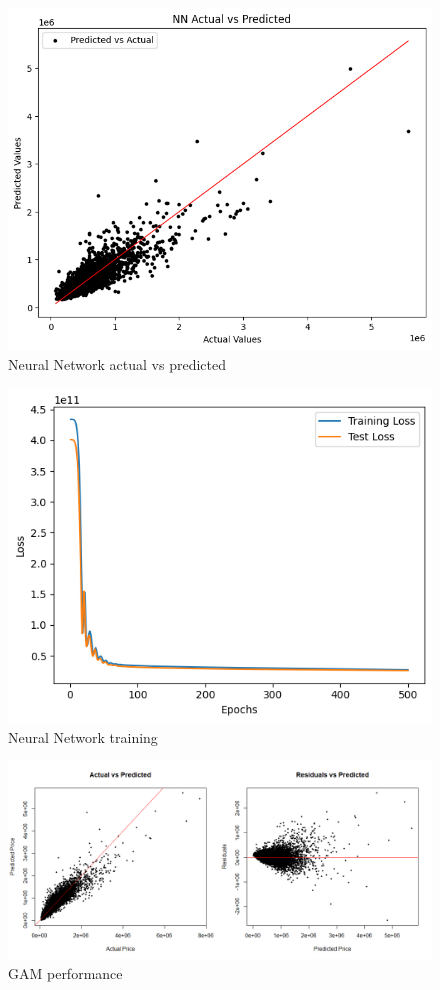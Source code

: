 \documentclass[a4paper, 11pt]{article}
\begin{document}
\begin{figure}[H]
\includegraphics[scale=0.7]{NNpred}
\centering
\caption{Neural Network actual vs predicted}
\label{fig:NNpred}
\end{figure}

\begin{figure}[H]
\includegraphics[scale=0.75]{traintestloss}
\centering
\caption{Neural Network training}
\label{fig:traintestloss}
\end{figure}

\begin{figure}[H]
\includegraphics[scale=0.5]{gamperf}
\centering
\caption{GAM performance}
\label{fig:gamperf}
\end{figure}
\end{document}
